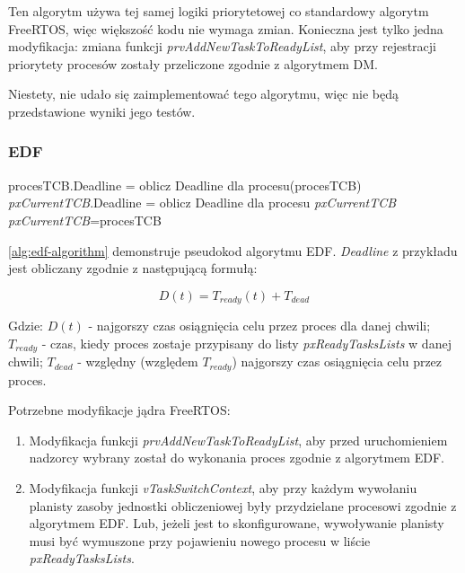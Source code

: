 \documentclass[../../main]{subfiles}
\begin{document}
Ten algorytm używa tej samej logiki priorytetowej co standardowy algorytm FreeRTOS, więc większość kodu nie wymaga zmian. Konieczna jest tylko jedna modyfikacja: zmiana funkcji \textit{prvAddNewTaskToReadyList}, aby przy rejestracji priorytety procesów zostały przeliczone zgodnie z algorytmem DM.

Niestety, nie udało się zaimplementować tego algorytmu, więc nie będą przedstawione wyniki jego testów.

\subsubsection{EDF}

\begin{algorithm}
\caption{Pseudokod algorytmu EDF}\label{alg:edf-algorithm}
\begin{algorithmic}[1]
    \State procesTCB.Deadline = oblicz Deadline dla procesu(procesTCB)
    \State \textit{pxCurrentTCB}.Deadline = oblicz Deadline dla procesu \textit{pxCurrentTCB}
        \State \textit{pxCurrentTCB}=procesTCB
    \EndIf
\EndFor
\end{algorithmic}
\end{algorithm}

\cref{alg:edf-algorithm} demonstruje pseudokod algorytmu EDF. \textit{Deadline} z przykładu jest obliczany zgodnie z następującą formułą:

\large
\begin{equation}
    D(t)=T_{ready}(t)+T_{dead}
    \label{eq:deadline}
\end{equation}
\normalsize

Gdzie: $D(t)$ - najgorszy czas osiągnięcia celu przez proces dla danej chwili; $T_{ready}$ - czas, kiedy proces zostaje przypisany do listy \textit{pxReadyTasksLists} w danej chwili; $T_{dead}$ - względny (względem $T_{ready}$) najgorszy czas osiągnięcia celu przez proces.

Potrzebne modyfikacje jądra FreeRTOS:

\begin{enumerate}
    \item Modyfikacja funkcji \textit{prvAddNewTaskToReadyList}, aby przed uruchomieniem nadzorcy wybrany został do wykonania proces zgodnie z algorytmem EDF.
    \item Modyfikacja funkcji \textit{vTaskSwitchContext}, aby przy każdym wywołaniu planisty zasoby jednostki obliczeniowej były przydzielane procesowi zgodnie z algorytmem EDF. Lub, jeżeli jest to skonfigurowane, wywoływanie planisty musi być wymuszone przy pojawieniu nowego procesu w liście \textit{pxReadyTasksLists}. 
\end{enumerate}
\end{document}
